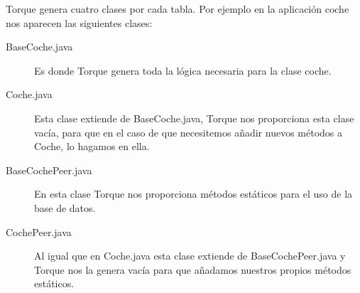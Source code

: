 Torque genera cuatro clases por cada tabla. Por ejemplo en la aplicación coche nos aparecen las siguientes clases:

\begin{description}
	\item[BaseCoche.java] Es donde Torque genera toda la lógica necesaria para la clase coche.

	\item[Coche.java] Esta clase extiende de BaseCoche.java, Torque nos proporciona esta clase vacía, para que en el caso de que necesitemos añadir nuevos métodos a Coche, lo hagamos en ella.

	\item[BaseCochePeer.java] En esta clase Torque nos proporciona métodos estáticos para el uso de la base de datos.

	\item[CochePeer.java] Al igual que en Coche.java esta clase extiende de BaseCochePeer.java y Torque nos la genera vacía para que añadamos nuestros propios métodos estáticos.
\end{description}